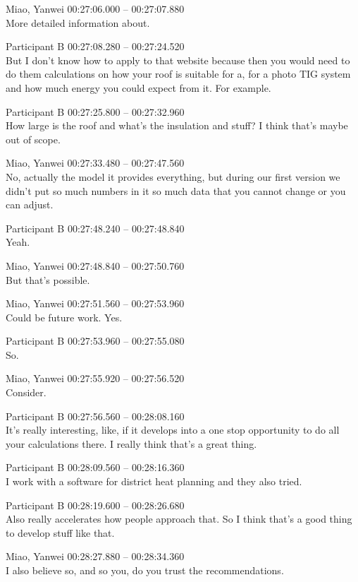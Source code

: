 {Miao, Yanwei 00:27:06.000 -- 00:27:07.880 \\
More detailed information about.

Participant B 00:27:08.280 -- 00:27:24.520 \\
But I don't know how to apply to that website because then you would need to do them calculations on how your roof is suitable for a, for a photo TIG system and how much energy you could expect from it. For example.

Participant B 00:27:25.800 -- 00:27:32.960 \\
How large is the roof and what's the insulation and stuff? I think that's maybe out of scope.

Miao, Yanwei 00:27:33.480 -- 00:27:47.560 \\
No, actually the model it provides everything, but during our first version we didn't put so much numbers in it so much data that you cannot change or you can adjust.

Participant B 00:27:48.240 -- 00:27:48.840 \\
Yeah.

Miao, Yanwei 00:27:48.840 -- 00:27:50.760 \\
But that's possible.

Miao, Yanwei 00:27:51.560 -- 00:27:53.960 \\
Could be future work. Yes.

Participant B 00:27:53.960 -- 00:27:55.080 \\
So.

Miao, Yanwei 00:27:55.920 -- 00:27:56.520 \\
Consider.

Participant B 00:27:56.560 -- 00:28:08.160 \\
It's really interesting, like, if it develops into a one stop opportunity to do all your calculations there. I really think that's a great thing.

Participant B 00:28:09.560 -- 00:28:16.360 \\
I work with a software for district heat planning and they also tried.

Participant B 00:28:19.600 -- 00:28:26.680 \\
Also really accelerates how people approach that. So I think that's a good thing to develop stuff like that.

Miao, Yanwei 00:28:27.880 -- 00:28:34.360 \\
I also believe so, and so you, do you trust the recommendations.

}

